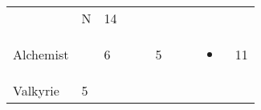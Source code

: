 \documentclass[12pt]{article}
\newcommand{\indexClass}[1]{\index{#1}}
\newcommand{\class}[1]{#1\indexClass{#1}}
\begin{document}
\begin{longtable}[]{@{}llllllllll@{}}
\begin{minipage}[t]{0.06\columnwidth}
\strut\end{minipage} &
\begin{minipage}[t]{0.07\columnwidth}\raggedright\strut
N
\strut\end{minipage} &
\begin{minipage}[t]{0.08\columnwidth}\raggedright\strut
14
\strut\end{minipage}\tabularnewline
\begin{minipage}[t]{0.13\columnwidth}\raggedright\strut
\class{Alchemist}
\strut\end{minipage} &
\begin{minipage}[t]{0.06\columnwidth}\raggedright\strut
\strut\end{minipage} &
\begin{minipage}[t]{0.06\columnwidth}\raggedright\strut
6
\strut\end{minipage} &
\begin{minipage}[t]{0.06\columnwidth}\raggedright\strut
\strut\end{minipage} &
\begin{minipage}[t]{0.06\columnwidth}\raggedright\strut
\strut\end{minipage} &
\begin{minipage}[t]{0.06\columnwidth}\raggedright\strut
5
\strut\end{minipage} &
\begin{minipage}[t]{0.06\columnwidth}\raggedright\strut
\strut\end{minipage} &
\begin{minipage}[t]{0.06\columnwidth}\raggedright\strut
\strut\end{minipage} &
\begin{minipage}[t]{0.07\columnwidth}\raggedright\strut
\begin{itemize}
\item
\end{itemize}
\strut\end{minipage} &
\begin{minipage}[t]{0.08\columnwidth}\raggedright\strut
11
\strut\end{minipage}\tabularnewline
\begin{minipage}[t]{0.13\columnwidth}\raggedright\strut
\class{Valkyrie}
\strut\end{minipage} &
\begin{minipage}[t]{0.06\columnwidth}\raggedright\strut
5
\strut\end{minipage} &
\begin{minipage}[t]{0.06\columnwidth}\raggedright\strut

\end{minipage}
\end{longtable}
\end{document}
